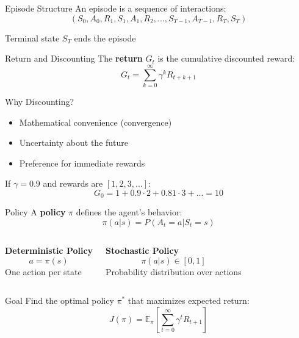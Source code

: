\documentclass[aspectratio=169,10pt]{beamer}
\begin{document}
\begin{frame}{Episode Structure}
An episode is a sequence of interactions:
$$(S_0, A_0, R_1, S_1, A_1, R_2, ..., S_{T-1}, A_{T-1}, R_T, S_T)$$

\begin{center}
\end{center}

Terminal state $S_T$ ends the episode
\end{frame}

\begin{frame}{Return and Discounting}
The \textbf{return} $G_t$ is the cumulative discounted reward:
$$G_t = \sum_{k=0}^{\infty} \gamma^k R_{t+k+1}$$

\begin{block}{Why Discounting?}
\begin{itemize}
    \item Mathematical convenience (convergence)
    \item Uncertainty about the future
    \item Preference for immediate rewards
\end{itemize}
\end{block}

\begin{example}
If $\gamma = 0.9$ and rewards are $[1, 2, 3, ...]$:
$$G_0 = 1 + 0.9 \cdot 2 + 0.81 \cdot 3 + ... = 10$$
\end{example}
\end{frame}

\begin{frame}{Policy}
A \textbf{policy} $\pi$ defines the agent's behavior:
$$\pi(a|s) = P(A_t = a | S_t = s)$$

\begin{columns}
\textbf{Deterministic Policy}
$$a = \pi(s)$$
One action per state

\textbf{Stochastic Policy}
$$\pi(a|s) \in [0,1]$$
Probability distribution over actions
\end{columns}

\begin{block}{Goal}
Find the optimal policy $\pi^*$ that maximizes expected return:
$$J(\pi) = \mathbb{E}_{\pi}\left[\sum_{t=0}^{\infty} \gamma^t R_{t+1}\right]$$
\end{block}
\end{frame}
\end{document}
